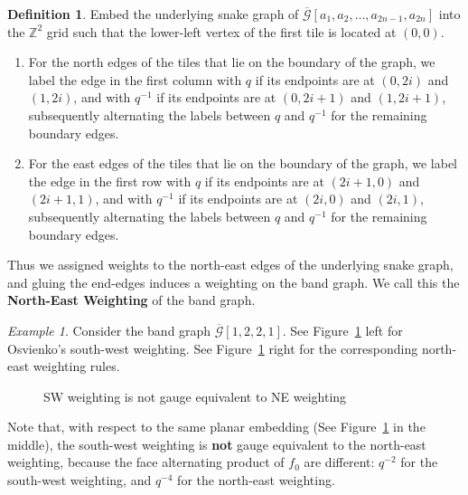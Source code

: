 \documentclass[11pt]{amsart}
\theoremstyle{definition}
\newtheorem{defn}[thm]{Definition}
\theoremstyle{remark}
\newtheorem{exmp}[thm]{Example}
\numberwithin{equation}{section}
\begin{document}
\begin{defn}\label{defn: NE_weighting}
    Embed the underlying snake graph of $\overline{\mathcal{G}}[a_1,a_2,\dots,a_{2n-1},a_{2n}]$ into the $\mathbb{Z}^2$ grid such that the lower-left vertex of the first tile is located at $(0,0)$.
    \begin{enumerate}
    \item For the north edges of the tiles that lie on the boundary of the graph, we label the edge in the first column with $q$ if its endpoints are at $(0,2i)$ and $(1,2i)$, and with $q^{-1}$ if its endpoints are at $(0,2i+1)$ and $(1,2i+1)$, subsequently alternating the labels between $q$ and $q^{-1}$ for the remaining boundary edges.
    \item For the east edges of the tiles that lie on the boundary of the graph, we label the edge in the first row with $q$ if its endpoints are at $(2i+1,0)$ and $(2i+1,1)$, and with $q^{-1}$ if its endpoints are at $(2i,0)$ and $(2i,1)$, subsequently alternating the labels between $q$ and $q^{-1}$ for the remaining boundary edges.
    \end{enumerate}
    Thus we assigned weights to the north-east edges of the underlying snake graph, and gluing the end-edges induces a weighting on the band graph. We call this the \textbf{North-East Weighting} of the band graph.
\end{defn}

\begin{exmp}\label{exmp:not_gauge_equiv_weights}
    Consider the band graph $\overline{\mathcal{G}}[1,2,2,1]$. See Figure~\ref{fig:sw_ne_weighting} left for Osvienko's south-west weighting. See Figure~\ref{fig:sw_ne_weighting} right for the corresponding north-east weighting rules. 

    \begin{figure}[h!]
    \centering
    
    \caption{SW weighting is not gauge equivalent to NE weighting}
    \label{fig:sw_ne_weighting}
    \end{figure}

    Note that, with respect to the same planar embedding (See Figure~\ref{fig:sw_ne_weighting} in the middle), the south-west weighting is \textbf{not} gauge equivalent to the north-east weighting, because the face alternating product of $f_0$ are different: $q^{-2}$ for the south-west weighting, and $q^{-4}$ for the north-east weighting.
\end{exmp}
\end{document}
